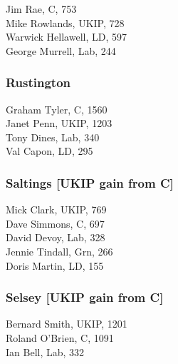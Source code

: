 \documentclass[a4paper,openany,10pt]{book}
\begin{document}


Jim Rae, C, 753\\
Mike Rowlands, UKIP, 728\\
Warwick Hellawell, LD, 597\\
George Murrell, Lab, 244\\


\subsubsection*{Rustington}



Graham Tyler, C, 1560\\
Janet Penn, UKIP, 1203\\
Tony Dines, Lab, 340\\
Val Capon, LD, 295\\


\subsubsection*{Saltings \hspace*{\fill}\nolinebreak[1]%
\enspace\hspace*{\fill}
[UKIP gain from C]}



Mick Clark, UKIP, 769\\
Dave Simmons, C, 697\\
David Devoy, Lab, 328\\
Jennie Tindall, Grn, 266\\
Doris Martin, LD, 155\\


\subsubsection*{Selsey \hspace*{\fill}\nolinebreak[1]%
\enspace\hspace*{\fill}
[UKIP gain from C]}



Bernard Smith, UKIP, 1201\\
Roland O'Brien, C, 1091\\
Ian Bell, Lab, 332\\
\end{document}
